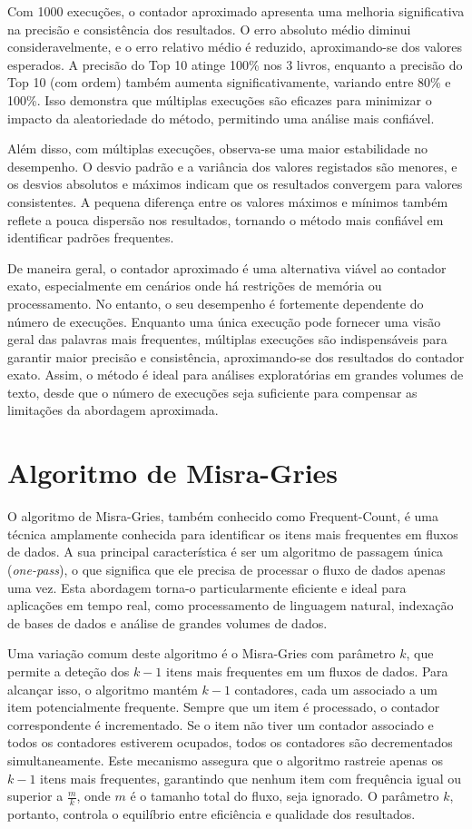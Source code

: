 \documentclass[shortpaper, portugues, times, mirror]{revdetua}
\begin{document}
Com 1000 execuções, o contador aproximado apresenta uma melhoria significativa na precisão e consistência dos resultados. O erro absoluto médio diminui consideravelmente, e o erro relativo médio é reduzido, aproximando-se dos valores esperados. A precisão do Top 10 atinge 100\% nos 3 livros, enquanto a precisão do Top 10 (com ordem) também aumenta significativamente, variando entre 80\% e 100\%. Isso demonstra que múltiplas execuções são eficazes para minimizar o impacto da aleatoriedade do método, permitindo uma análise mais confiável.

Além disso, com múltiplas execuções, observa-se uma maior estabilidade no desempenho. O desvio padrão e a variância dos valores registados são menores, e os desvios absolutos e máximos indicam que os resultados convergem para valores consistentes. A pequena diferença entre os valores máximos e mínimos também reflete a pouca dispersão nos resultados, tornando o método mais confiável em identificar padrões frequentes.

De maneira geral, o contador aproximado é uma alternativa viável ao contador exato, especialmente em cenários onde há restrições de memória ou processamento. No entanto, o seu desempenho é fortemente dependente do número de execuções. Enquanto uma única execução pode fornecer uma visão geral das palavras mais frequentes, múltiplas execuções são indispensáveis para garantir maior precisão e consistência, aproximando-se dos resultados do contador exato. Assim, o método é ideal para análises exploratórias em grandes volumes de texto, desde que o número de execuções seja suficiente para compensar as limitações da abordagem aproximada.

\section{Algoritmo de Misra-Gries}

O algoritmo de Misra-Gries, também conhecido como Frequent-Count, é uma técnica amplamente conhecida para identificar os itens mais frequentes em fluxos de dados. A sua principal característica é ser um algoritmo de passagem única (\textit{one-pass}), o que significa que ele precisa de processar o fluxo de dados apenas uma vez. Esta abordagem torna-o particularmente eficiente e ideal para aplicações em tempo real, como processamento de linguagem natural, indexação de bases de dados e análise de grandes volumes de dados.

Uma variação comum deste algoritmo é o Misra-Gries com parâmetro \(k\), que permite a deteção dos \(k-1\) itens mais frequentes em um fluxos de dados. Para alcançar isso, o algoritmo mantém \(k-1\) contadores, cada um associado a um item potencialmente frequente. Sempre que um item é processado, o contador correspondente é incrementado. Se o item não tiver um contador associado e todos os contadores estiverem ocupados, todos os contadores são decrementados simultaneamente. Este mecanismo assegura que o algoritmo rastreie apenas os \(k-1\) itens mais frequentes, garantindo que nenhum item com frequência igual ou superior a \(\frac{m}{k}\), onde \(m\) é o tamanho total do fluxo, seja ignorado. O parâmetro \(k\), portanto, controla o equilíbrio entre eficiência e qualidade dos resultados.
\end{document}
